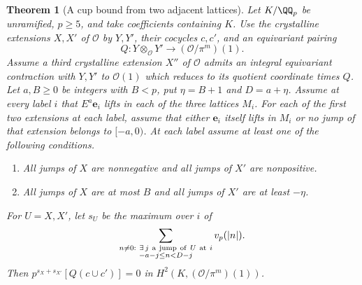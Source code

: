 \documentclass[a4paper,11pt]{article}
\newtheorem{theorem}[proposition]{Theorem}
\theoremstyle{definition}
\theoremstyle{remark}
\numberwithin{equation}{section}
\begin{document}
\begin{theorem}[A cup bound from two adjacent lattices]
\leavevmode\label{thm:twolatticecup768}
Let \(K/\QQ_p\) be unramified, \(p\ge5\), and take coefficients
containing \(K\). Use the crystalline extensions \(X,X'\) of
\(\mathcal O\) by \(Y,Y'\), their cocycles \(c,c'\), and an
equivariant pairing
\[
   Q:Y\otimes_{\mathcal O}Y'\longrightarrow(\mathcal O/\pi^m)(1).
\]
Assume a third crystalline extension \(X''\) of \(\mathcal O\)
admits an integral equivariant contraction with \(Y,Y'\)
to \(\mathcal O(1)\) which reduces to its quotient coordinate
times \(Q\). Let \(a,B\ge0\) be integers with \(B<p\), put
\(\eta=B+1\) and \(D=a+\eta\). Assume at every label \(i\)
that \(E^a\mathbf e_i\) lifts in each of the three lattices
\(M_i\). For each of the first two extensions at each label,
assume that either \(\mathbf e_i\) itself lifts in \(M_i\)
or no jump of that extension belongs to \([-a,0)\).
At each label assume at least one of the following conditions.
\begin{enumerate}
\item All jumps of \(X\) are nonnegative and all jumps
of \(X'\) are nonpositive.
\item All jumps of \(X\) are at most \(B\) and all jumps
of \(X'\) are at least \(-\eta\).
\end{enumerate}
For \(U=X,X'\), let \(s_U\) be the maximum over \(i\) of
\[
 \sum_{\substack{n\ne0:\ \exists\, j\ {\rm a\ jump\ of}\ U\
                      {\rm at}\ i\\-a-j\le n<D-j}}v_p(|n|).
\]
Then \(p^{s_X+s_{X'}}[Q(c\cup c')]=0\) in
\(H^2(K,(\mathcal O/\pi^m)(1))\).
\end{theorem}
\end{document}
